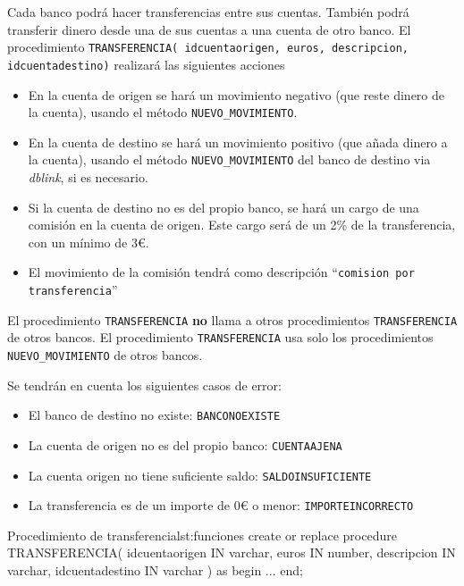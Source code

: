 \begin{homeworkProblem}
Cada banco podrá hacer transferencias entre sus cuentas. También podrá transferir dinero desde una de sus cuentas a una cuenta de otro banco. El procedimiento \texttt{TRANSFERENCIA( idcuentaorigen, euros, descripcion, idcuentadestino)} realizará las siguientes acciones
\begin{itemize}
\item En la cuenta de origen se hará un movimiento negativo (que reste dinero de la cuenta), usando el método \texttt{NUEVO\_MOVIMIENTO}.
\item En la cuenta de destino se hará un movimiento positivo (que añada dinero a la cuenta), usando el método \texttt{NUEVO\_MOVIMIENTO} del banco de destino via \textit{dblink}, si es necesario.
\item Si la cuenta de destino no es del propio banco, se hará un cargo de una comisión en la cuenta de origen. Este cargo será de un 2\% de la transferencia, con un mínimo de 3\euro.
\item El movimiento de la comisión tendrá como descripción ``\texttt{comision por transferencia}''  
\end{itemize}

\begin{Aviso}
  El procedimiento \texttt{TRANSFERENCIA} \textbf{no} llama a otros procedimientos \texttt{TRANSFERENCIA} de otros bancos.
  El procedimiento \texttt{TRANSFERENCIA} usa solo los procedimientos \texttt{NUEVO\_MOVIMIENTO} de otros bancos.
\end{Aviso}


Se tendrán en cuenta los siguientes casos de error:
\begin{itemize}
\item El banco de destino no existe: \texttt{BANCONOEXISTE}
\item La cuenta de origen no es del propio banco: \texttt{CUENTAAJENA}
\item La cuenta origen no tiene suficiente saldo: \texttt{SALDOINSUFICIENTE}
\item La transferencia es de un importe de 0{\euro} o menor: \texttt{IMPORTEINCORRECTO}
\end{itemize}

  \begin{listadosql}{Procedimiento de transferencia}{lst:funciones}
create or replace procedure TRANSFERENCIA(
  idcuentaorigen IN varchar, 
  euros IN number,
  descripcion IN varchar,
  idcuentadestino IN varchar )
as begin
  ...
end; 


\end{listadosql}
\end{homeworkProblem}
